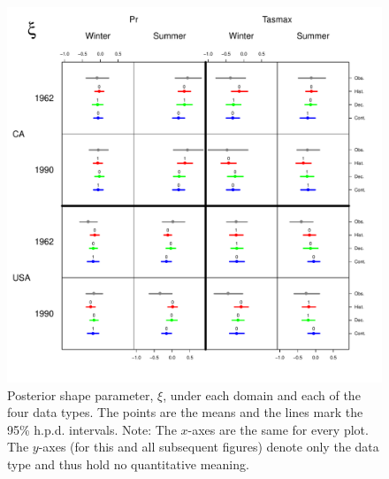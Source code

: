 \begin{figure}
\begin{center}
 \includegraphics[scale=0.61]{figs/shape.pdf}   %
\end{center}
\caption{Posterior shape parameter, $\xi$, under each domain and each of the four data types. The points are the means and the lines mark the 95\% h.p.d. intervals. Note: The $x$-axes are the same for every plot. The $y$-axes (for this and all subsequent figures) denote only the data type and thus hold no quantitative meaning.}
\label{ksi}
\end{figure}

